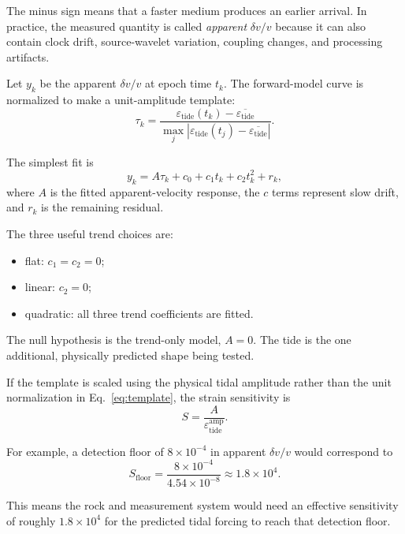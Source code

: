 \documentclass[11pt]{article}
\newcommand{\dvv}{\delta v/v}
\newcommand{\eps}{\varepsilon}
\begin{document}
The minus sign means that a faster medium produces an earlier arrival.  In
practice, the measured quantity is called \emph{apparent} $\dvv$ because it
can also contain clock drift, source-wavelet variation, coupling changes, and
processing artifacts.

Let $y_k$ be the apparent $\dvv$ at epoch time $t_k$.  The forward-model curve
is normalized to make a unit-amplitude template:
\begin{equation}
  \tau_k =
  \frac{\eps_{\mathrm{tide}}(t_k)-\overline{\eps_{\mathrm{tide}}}}
       {\max_j\left|\eps_{\mathrm{tide}}(t_j)-\overline{\eps_{\mathrm{tide}}}\right|}.
  \label{eq:template}
\end{equation}

The simplest fit is
\begin{equation}
  y_k = A\tau_k + c_0+c_1t_k+c_2t_k^2+r_k,
  \label{eq:fit_model}
\end{equation}
where $A$ is the fitted apparent-velocity response, the $c$ terms represent
slow drift, and $r_k$ is the remaining residual.

The three useful trend choices are:
\begin{itemize}[nosep]
  \item flat: $c_1=c_2=0$;
  \item linear: $c_2=0$;
  \item quadratic: all three trend coefficients are fitted.
\end{itemize}

The null hypothesis is the trend-only model, $A=0$.  The tide is the one
additional, physically predicted shape being tested.

If the template is scaled using the physical tidal amplitude rather than the
unit normalization in Eq.~\eqref{eq:template}, the strain sensitivity is
\begin{equation}
  S = \frac{A}{\eps_{\mathrm{tide}}^{\mathrm{amp}}}.
  \label{eq:sensitivity}
\end{equation}

For example, a detection floor of $8\times10^{-4}$ in apparent $\dvv$ would
correspond to
\begin{equation}
  S_{\mathrm{floor}}
  = \frac{8\times10^{-4}}{4.54\times10^{-8}}
  \approx 1.8\times10^4.
\end{equation}

This means the rock and measurement system would need an effective sensitivity
of roughly $1.8\times10^4$ for the predicted tidal forcing to reach that
detection floor.
\end{document}
